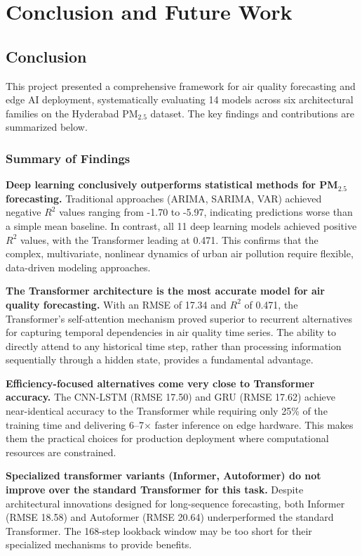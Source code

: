\chapter{Conclusion and Future Work}

\section{Conclusion}

This project presented a comprehensive framework for air quality forecasting and edge AI deployment, systematically evaluating 14 models across six architectural families on the Hyderabad PM$_{2.5}$ dataset. The key findings and contributions are summarized below.

\subsection{Summary of Findings}

\textbf{Deep learning conclusively outperforms statistical methods for PM$_{2.5}$ forecasting.} Traditional approaches (ARIMA, SARIMA, VAR) achieved negative $R^2$ values ranging from -1.70 to -5.97, indicating predictions worse than a simple mean baseline. In contrast, all 11 deep learning models achieved positive $R^2$ values, with the Transformer leading at 0.471. This confirms that the complex, multivariate, nonlinear dynamics of urban air pollution require flexible, data-driven modeling approaches.

\textbf{The Transformer architecture is the most accurate model for air quality forecasting.} With an RMSE of 17.34 and $R^2$ of 0.471, the Transformer's self-attention mechanism proved superior to recurrent alternatives for capturing temporal dependencies in air quality time series. The ability to directly attend to any historical time step, rather than processing information sequentially through a hidden state, provides a fundamental advantage.

\textbf{Efficiency-focused alternatives come very close to Transformer accuracy.} The CNN-LSTM (RMSE 17.50) and GRU (RMSE 17.62) achieve near-identical accuracy to the Transformer while requiring only 25\% of the training time and delivering 6--7$\times$ faster inference on edge hardware. This makes them the practical choices for production deployment where computational resources are constrained.

\textbf{Specialized transformer variants (Informer, Autoformer) do not improve over the standard Transformer for this task.} Despite architectural innovations designed for long-sequence forecasting, both Informer (RMSE 18.58) and Autoformer (RMSE 20.64) underperformed the standard Transformer. The 168-step lookback window may be too short for their specialized mechanisms to provide benefits.

